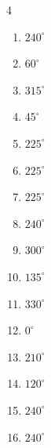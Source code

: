 \begin{multicols}{4}
\begin{enumerate}
  \item $\displaystyle 240^{\circ}$

  \item $\displaystyle 60^{\circ}$

  \item $\displaystyle 315^{\circ}$

  \item $\displaystyle 45^{\circ}$

  \item $\displaystyle 225^{\circ}$

  \item $\displaystyle 225^{\circ}$

  \item $\displaystyle 225^{\circ}$

  \item $\displaystyle 240^{\circ}$

  \item $\displaystyle 300^{\circ}$

  \item $\displaystyle 135^{\circ}$

  \item $\displaystyle 330^{\circ}$

  \item $\displaystyle 0^{\circ}$
        \phantom{$\displaystyle =0$}

  \item $\displaystyle 210^{\circ}$

  \item $\displaystyle 120^{\circ}$

  \item $\displaystyle 240^{\circ}$

  \item $\displaystyle 240^{\circ}$


\end{enumerate}
\end{multicols}
